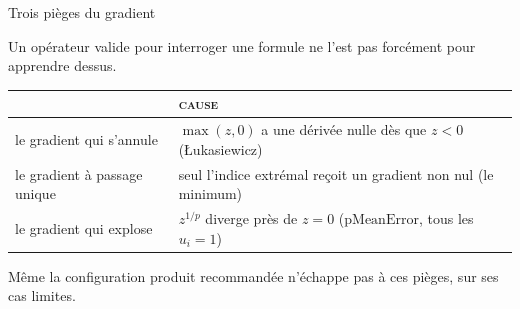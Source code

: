 \documentclass[aspectratio=169,10pt]{beamer}
\begin{document}
\begin{frame}{Trois pièges du gradient}
  \begin{center}
    \small Un opérateur valide pour \alert{interroger} une formule ne
    l'est pas forcément pour \alert{apprendre} dessus.
  \end{center}

  \vspace{0.3em}
  \begin{center}
  \footnotesize
  \renewcommand{\arraystretch}{1.55}
  \begin{tabular}{@{} >{\raggedright\arraybackslash}p{4.1cm}
                       >{\raggedright\arraybackslash}p{4.1cm} @{}}
    \toprule
    {\color{ash}\scshape\footnotesize problème} &
    {\color{ash}\scshape\footnotesize cause} \\
    \midrule
    le gradient qui s'annule & $\max(z,0)$ a une dérivée nulle dès que
      $z<0$ (Łukasiewicz) \\
    le gradient à passage unique & seul l'indice extrémal reçoit un
      gradient non nul (le minimum) \\
    le gradient qui explose & $z^{1/p}$ diverge près de $z=0$
      ($\mathrm{pMeanError}$, tous les $u_i=1$) \\
    \bottomrule
  \end{tabular}
  \end{center}

  \vspace{0.4em}
  \begin{center}
    \small Même la configuration produit recommandée n'échappe pas à
    ces pièges, sur ses \alert{cas limites}.
  \end{center}
\end{frame}
\end{document}
